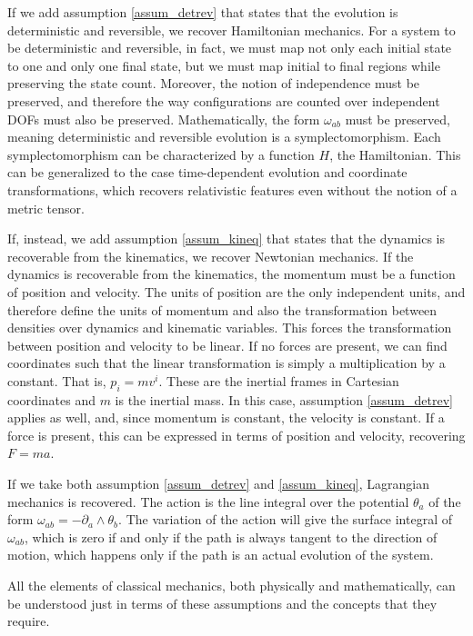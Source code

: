 If we add assumption \ref{assum_detrev} that states that the evolution is deterministic and reversible, we recover Hamiltonian mechanics. For a system to be deterministic and reversible, in fact, we must map not only each initial state to one and only one final state, but we must map initial to final regions while preserving the state count. Moreover, the notion of independence must be preserved, and therefore the way configurations are counted over independent DOFs must also be preserved. Mathematically, the form $\omega_{ab}$ must be preserved, meaning deterministic and reversible evolution is a symplectomorphism. Each symplectomorphism can be characterized by a function $H$, the Hamiltonian. This can be generalized to the case time-dependent evolution and coordinate transformations, which recovers relativistic features even without the notion of a metric tensor.

If, instead, we add assumption \ref{assum_kineq} that states that the dynamics is recoverable from the kinematics, we recover Newtonian mechanics. If the dynamics is recoverable from the kinematics, the momentum must be a function of position and velocity. The units of position are the only independent units, and therefore define the units of momentum and also the transformation between densities over dynamics and kinematic variables. This forces the transformation between position and velocity to be linear. If no forces are present, we can find coordinates such that the linear transformation is simply a multiplication by a constant. That is, $p_i = m v^i$. These are the inertial frames in Cartesian coordinates and $m$ is the inertial mass. In this case, assumption \ref{assum_detrev} applies as well, and, since momentum is constant, the velocity is constant. If a force is present, this can be expressed in terms of position and velocity, recovering $F = m a$.

If we take both assumption \ref{assum_detrev} and \ref{assum_kineq}, Lagrangian mechanics is recovered. The action is the line integral over the potential $\theta_a$ of the form $\omega_{ab} = - \partial_a \wedge \theta_b$. The variation of the action will give the surface integral of $\omega_{ab}$, which is zero if and only if the path is always tangent to the direction of motion, which happens only if the path is an actual evolution of the system.

All the elements of classical mechanics, both physically and mathematically, can be understood just in terms of these assumptions and the concepts that they require.
